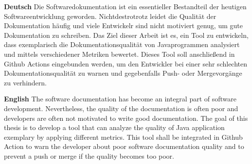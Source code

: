 \textbf{Deutsch}
Die Softwaredokumentation ist ein essentieller Bestandteil der  heutigen Softwareentwicklung geworden. Nichtdestrotrotz leidet die Qualität der Dokumentation häufig und viele Entwickelr sind nicht motiviert genug, um gute Dokumentation zu schreiben. Das Ziel dieser Arbeit ist es, ein Tool zu entwickeln, dass exemplarisch die Dokumentationsqualität von Javaprogrammen analysiert und mittels verschiedener Metriken bewertet. Dieses Tool soll anschließend in Github Actions eingebunden werden, um den Entwickler bei einer sehr schlechten Dokumentationsqualität zu warnen und gegebenfalls Push- oder Mergevorgänge zu verhindern.

\bigskip

\noindent
\textbf{English} 
The software documentation has become an integral part of software development. Nevertheless, the quality of the documentation is often poor and developers are often not motivated to write good documentation. The goal of this thesis is to develop a tool that can analyze the quality of Java application exemplary by applying different metrics. This tool shall be integrated in Github Action to warn the developer about poor software documentation quality and to prevent a push or merge if the quality becomes too poor.  

